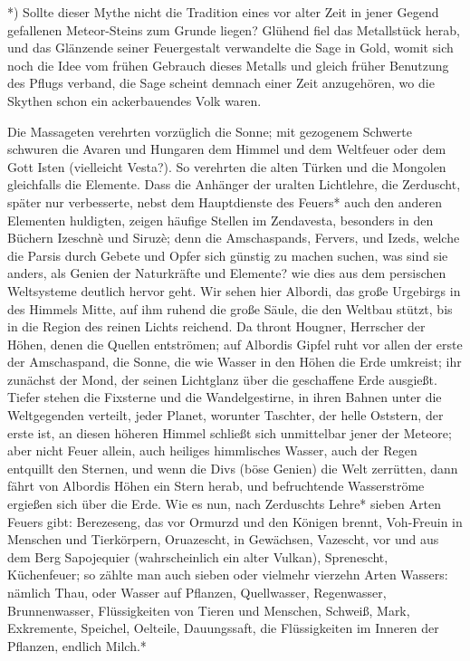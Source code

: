 \documentclass[a4paper, 11pt, oneside, polutonikogreek, german]{article}
\begin{document}
*) Sollte dieser Mythe nicht die Tradition eines vor alter Zeit in jener Gegend gefallenen Meteor-Steins zum Grunde liegen? Glühend fiel das Metallstück herab, und das Glänzende seiner Feuergestalt verwandelte die Sage in Gold, womit sich noch die Idee vom frühen Gebrauch dieses Metalls und gleich früher Benutzung des Pflugs verband, die Sage scheint demnach einer Zeit anzugehören, wo die Skythen schon ein ackerbauendes Volk waren.

Die Massageten verehrten vorzüglich die Sonne; mit gezogenem Schwerte schwuren die Avaren und Hungaren dem Himmel und dem Weltfeuer oder dem Gott Isten (vielleicht Vesta?). So verehrten die alten Türken und die Mongolen gleichfalls die Elemente. Dass die Anhänger der uralten Lichtlehre, die Zerduscht, später nur verbesserte, nebst dem Hauptdienste des Feuers* auch den anderen Elementen huldigten, zeigen häufige Stellen im Zendavesta, besonders in den Büchern Izeschnè und Siruzè; denn die Amschaspands, Fervers, und Izeds, welche die Parsis durch Gebete und Opfer sich günstig zu machen suchen, was sind sie anders, als Genien der Naturkräfte und Elemente? wie dies aus dem persischen Weltsysteme deutlich hervor geht. Wir sehen hier Albordi, das große Urgebirgs in des Himmels Mitte, auf ihm ruhend die große Säule, die den Weltbau stützt, bis in die Region des reinen Lichts reichend. Da thront Hougner, Herrscher der Höhen, denen die Quellen entströmen; auf Albordis Gipfel ruht vor allen der erste der Amschaspand, die Sonne, die wie Wasser in den Höhen die Erde umkreist; ihr zunächst der Mond, der seinen Lichtglanz über die geschaffene Erde ausgießt. Tiefer stehen die Fixsterne und die Wandelgestirne, in ihren Bahnen unter die Weltgegenden verteilt, jeder Planet, worunter Taschter, der helle Oststern, der erste ist, an diesen höheren Himmel schließt sich unmittelbar jener der Meteore; aber nicht Feuer allein, auch heiliges himmlisches Wasser, auch der Regen entquillt den Sternen, und wenn die Divs (böse Genien) die Welt zerrütten, dann fährt von Albordis Höhen ein Stern herab, und befruchtende Wasserströme ergießen sich über die Erde. Wie es nun, nach Zerduschts Lehre* sieben Arten Feuers gibt: Berezeseng, das vor Ormurzd und den Königen brennt, Voh-Freuin in Menschen und Tierkörpern, Oruazescht, in Gewächsen, Vazescht, vor und aus dem Berg Sapojequier (wahrscheinlich ein alter Vulkan), Sprenescht, Küchenfeuer; so zählte man auch sieben oder vielmehr vierzehn Arten Wassers: nämlich Thau, oder Wasser auf Pflanzen, Quellwasser, Regenwasser, Brunnenwasser, Flüssigkeiten von Tieren und Menschen, Schweiß, Mark, Exkremente, Speichel, Oelteile, Dauungssaft, die Flüssigkeiten im Inneren der Pflanzen, endlich Milch.*
\end{document}
